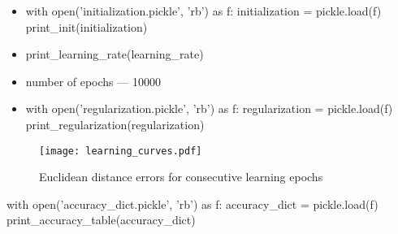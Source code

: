 \documentclass[11pt]{article}
\begin{document}
\begin{itemize}
\item
\begin{pycode}
with open('initialization.pickle', 'rb') as f:
    initialization = pickle.load(f)
print_init(initialization)
\end{pycode}
\item
\begin{pycode}
print_learning_rate(learning_rate)
\end{pycode}
\item number of epochs --- 10000
\item
\begin{pycode}
with open('regularization.pickle', 'rb') as f:
    regularization = pickle.load(f)
print_regularization(regularization)
\end{pycode}
\end{itemize}
    \begin{figure}[h!]
        \centering
        \texttt{[image: learning\_curves.pdf]}
        \caption{Euclidean distance errors for consecutive learning epochs}
    \end{figure}
\begin{pycode}
with open('accuracy_dict.pickle', 'rb') as f:
    accuracy_dict = pickle.load(f)
print_accuracy_table(accuracy_dict)
\end{pycode}
\end{document}
